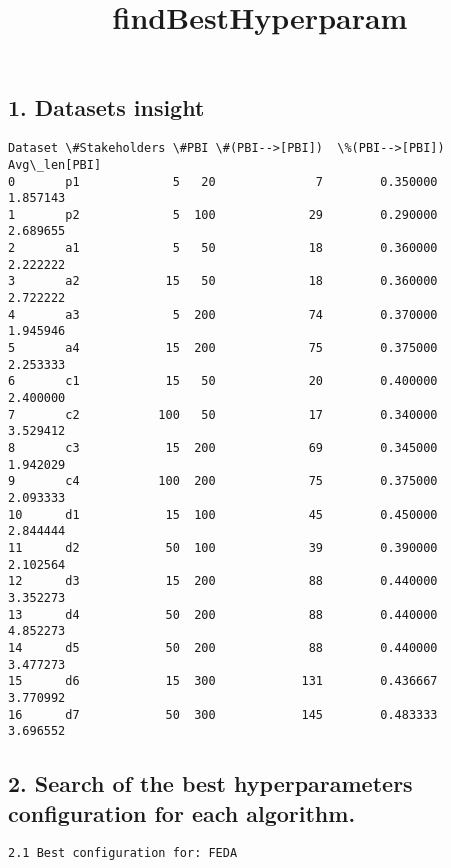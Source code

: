 \documentclass[11pt]{article}
\title{findBestHyperparam}
\begin{document}
    
    \maketitle
    
    

    
    \subsection{1. Datasets insight}\label{datasets-insight}

    
    \begin{Verbatim}[commandchars=\\\{\}]
   Dataset \#Stakeholders \#PBI \#(PBI-->[PBI])  \%(PBI-->[PBI])  Avg\_len[PBI]
0       p1             5   20              7        0.350000      1.857143
1       p2             5  100             29        0.290000      2.689655
2       a1             5   50             18        0.360000      2.222222
3       a2            15   50             18        0.360000      2.722222
4       a3             5  200             74        0.370000      1.945946
5       a4            15  200             75        0.375000      2.253333
6       c1            15   50             20        0.400000      2.400000
7       c2           100   50             17        0.340000      3.529412
8       c3            15  200             69        0.345000      1.942029
9       c4           100  200             75        0.375000      2.093333
10      d1            15  100             45        0.450000      2.844444
11      d2            50  100             39        0.390000      2.102564
12      d3            15  200             88        0.440000      3.352273
13      d4            50  200             88        0.440000      4.852273
14      d5            50  200             88        0.440000      3.477273
15      d6            15  300            131        0.436667      3.770992
16      d7            50  300            145        0.483333      3.696552
    \end{Verbatim}

    
    \subsection{2. Search of the best hyperparameters configuration for each
algorithm.}\label{search-of-the-best-hyperparameters-configuration-for-each-algorithm.}

    \begin{verbatim}
2.1 Best configuration for: FEDA
\end{verbatim}
\end{document}
